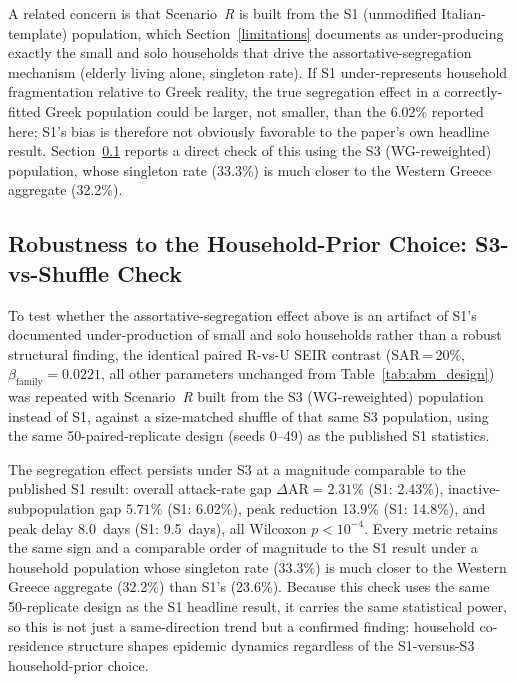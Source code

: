 \documentclass{article}
\begin{document}
A related concern is that Scenario~\textit{R} is built from the S1 (unmodified Italian-template) population, which Section~\ref{limitations} documents as under-producing exactly the small and solo households that drive the assortative-segregation mechanism (elderly living alone, singleton rate). If S1 under-represents household fragmentation relative to Greek reality, the true segregation effect in a correctly-fitted Greek population could be larger, not smaller, than the 6.02\% reported here; S1's bias is therefore not obviously favorable to the paper's own headline result. Section~\ref{s3-vs-shuffle-robustness} reports a direct check of this using the S3 (WG-reweighted) population, whose singleton rate (33.3\%) is much closer to the Western Greece aggregate (32.2\%).

\subsection{Robustness to the Household-Prior Choice: S3-vs-Shuffle Check}\label{s3-vs-shuffle-robustness}

To test whether the assortative-segregation effect above is an artifact of S1's documented under-production of small and solo households rather than a robust structural finding, the identical paired R-vs-U SEIR contrast (SAR\,=\,20\%, $\beta_\mathrm{family}=0.0221$, all other parameters unchanged from Table~\ref{tab:abm_design}) was repeated with Scenario~\textit{R} built from the S3 (WG-reweighted) population instead of S1, against a size-matched shuffle of that same S3 population, using the same 50-paired-replicate design (seeds 0--49) as the published S1 statistics.

The segregation effect persists under S3 at a magnitude comparable to the published S1 result: overall attack-rate gap $\Delta\mathrm{AR}=2.31$\% (S1: 2.43\%), inactive-subpopulation gap $5.71$\% (S1: 6.02\%), peak reduction 13.9\% (S1: 14.8\%), and peak delay 8.0~days (S1: 9.5~days), all Wilcoxon $p<10^{-4}$. Every metric retains the same sign and a comparable order of magnitude to the S1 result under a household population whose singleton rate (33.3\%) is much closer to the Western Greece aggregate (32.2\%) than S1's (23.6\%). Because this check uses the same 50-replicate design as the S1 headline result, it carries the same statistical power, so this is not just a same-direction trend but a confirmed finding: household co-residence structure shapes epidemic dynamics regardless of the S1-versus-S3 household-prior choice.
\end{document}
